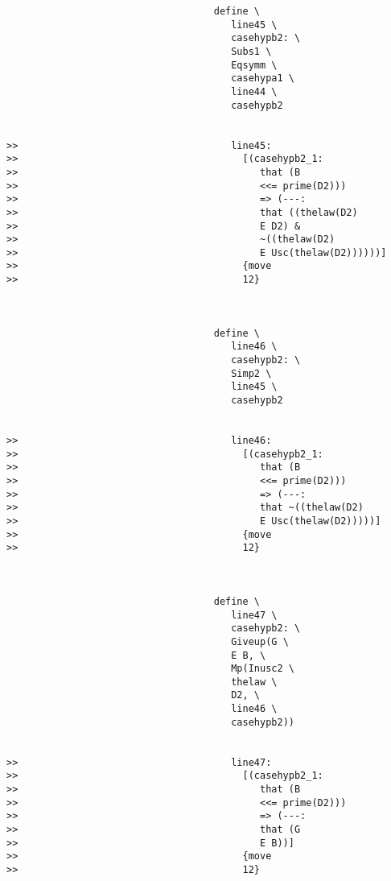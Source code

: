 \documentclass[12pt]{article}
\begin{document}
\begin{verbatim}
                                    define \
                                       line45 \
                                       casehypb2: \
                                       Subs1 \
                                       Eqsymm \
                                       casehypa1 \
                                       line44 \
                                       casehypb2


>>                                     line45:
>>                                       [(casehypb2_1:
>>                                          that (B
>>                                          <<= prime(D2)))
>>                                          => (---:
>>                                          that ((thelaw(D2)
>>                                          E D2) &
>>                                          ~((thelaw(D2)
>>                                          E Usc(thelaw(D2))))))]
>>                                       {move
>>                                       12}



                                    define \
                                       line46 \
                                       casehypb2: \
                                       Simp2 \
                                       line45 \
                                       casehypb2


>>                                     line46:
>>                                       [(casehypb2_1:
>>                                          that (B
>>                                          <<= prime(D2)))
>>                                          => (---:
>>                                          that ~((thelaw(D2)
>>                                          E Usc(thelaw(D2)))))]
>>                                       {move
>>                                       12}



                                    define \
                                       line47 \
                                       casehypb2: \
                                       Giveup(G \
                                       E B, \
                                       Mp(Inusc2 \
                                       thelaw \
                                       D2, \
                                       line46 \
                                       casehypb2))


>>                                     line47:
>>                                       [(casehypb2_1:
>>                                          that (B
>>                                          <<= prime(D2)))
>>                                          => (---:
>>                                          that (G
>>                                          E B))]
>>                                       {move
>>                                       12}




\end{verbatim}
\end{document}
